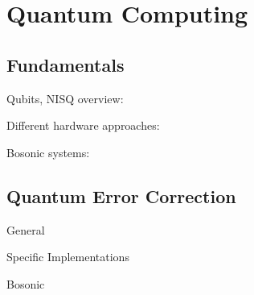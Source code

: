 
\chapter{Quantum Computing}
 
\section{Fundamentals}
Qubits, NISQ overview: \cite{Nielsen2010} \cite{Preskill2018} \cite{IBMintro} \cite{Kaye2007} \cite{Cleve2021}

Different hardware approaches: \cite{Dwave} \cite{Zurich} \cite{IBMtec}

Bosonic systems: \cite{Zurich} \cite{Girvin2021}

\section{Quantum Error Correction}
General \cite{Girvin2021} \cite{Andersen2020} \cite{Gottesman2009} \cite{Roffe2019} \cite{devitt}

Specific Implementations \cite{Krinner2021} \cite{Chen2021} \cite{cleland2022}

Bosonic \cite{campagne2020} \cite{Lau2016} \cite{Chuang1997} \cite{Terhal2020} \cite{Blais2020} \cite{Hu2019} \cite{Michael2016} \cite{Grimsmo2021} \cite{Cai2021} \cite{Brady2023} \cite{lachance2023}